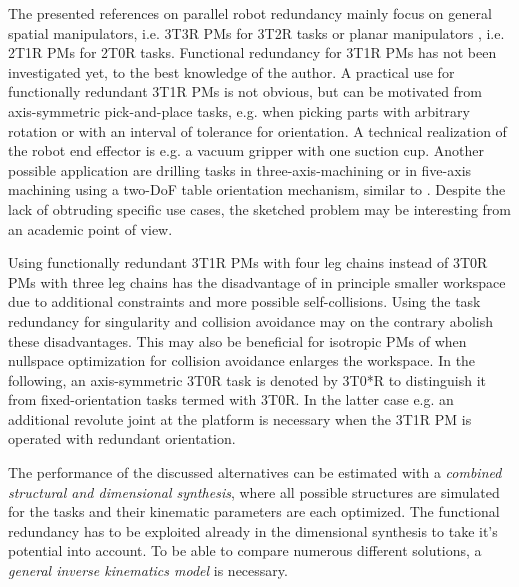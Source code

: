 \documentclass[
	graybox,
	vecphys] %
	{svmult}
\begin{document}
The presented references on parallel robot redundancy mainly focus on general spatial manipulators, i.e. 3T3R PMs for 3T2R tasks \cite{MerletPerDan2000,OenWan2007,CorinaldiAngCal2016,SchapplerTapOrt2019} or planar manipulators \cite{AgarwalNasBan2016}, i.e. 2T1R PMs for 2T0R tasks.
Functional redundancy for 3T1R PMs %
has not been investigated yet, to the best knowledge of the author.
A practical use for functionally redundant 3T1R PMs is not obvious, but can be motivated from axis-symmetric pick-and-place tasks, e.g. when picking parts with arbitrary rotation or with an interval of tolerance for orientation.
A technical realization of the robot end effector is e.g. a vacuum gripper with one suction cup.
Another possible application are drilling tasks in three-axis-machining or in five-axis machining using a two-DoF table orientation mechanism, similar to \cite{CorinaldiAngCal2016}.
Despite the lack of obtruding specific use cases, the sketched problem may be interesting from an academic point of view. %

Using functionally redundant 3T1R PMs with four leg chains instead of 3T0R PMs with three leg chains has the disadvantage of in principle smaller workspace due to additional constraints and more possible self-collisions.
Using the task redundancy for singularity and collision avoidance may on the contrary abolish these disadvantages.
This may also be beneficial for isotropic PMs of \cite{Carricato2005,Gogu2008} when nullspace optimization for collision avoidance enlarges the workspace.
In the following, an axis-symmetric 3T0R task is denoted by 3T0*R to distinguish it from fixed-orientation tasks termed with 3T0R.
In the latter case e.g. an additional revolute joint at the platform is necessary when the 3T1R PM is operated with redundant orientation.

The performance of the discussed alternatives can be estimated with a \emph{combined structural and dimensional synthesis}, where all possible structures are simulated for the tasks and their kinematic parameters are each optimized. %
The functional redundancy has to be exploited already in the dimensional synthesis to take it's potential into account.
To be able to compare numerous different solutions, a \emph{general inverse kinematics model} is necessary.
\end{document}

